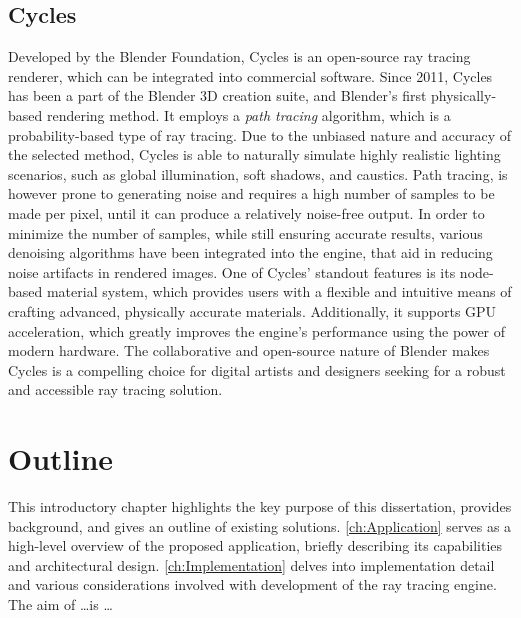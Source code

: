 \subsection{Cycles}

Developed by the Blender Foundation, Cycles \supercite{Cycles} is an open-source ray tracing renderer, which can be integrated into commercial software. 
Since 2011, Cycles has been a part of the Blender 3D creation suite, and Blender's first physically-based rendering method.
It employs a \textit{path tracing} algorithm, which is a probability-based type of ray tracing.
Due to the unbiased nature and accuracy of the selected method, Cycles is able to naturally simulate highly realistic lighting scenarios, such as global illumination, soft shadows, and caustics.
Path tracing, is however prone to generating noise and requires a high number of samples to be made per pixel, until it can produce a relatively noise-free output.
In order to minimize the number of samples, while still ensuring accurate results, various denoising algorithms have been integrated into the engine, that aid in reducing noise artifacts in rendered images.
One of Cycles' standout features is its node-based material system, which provides users with a flexible and intuitive means of crafting advanced, physically accurate materials. 
Additionally, it supports GPU acceleration, which greatly improves the engine's performance using the power of modern hardware.
The collaborative and open-source nature of Blender makes Cycles is a compelling choice for digital artists and designers seeking for a robust and accessible ray tracing solution.

\section{Outline}

This introductory chapter highlights the key purpose of this dissertation, provides background, and gives an outline of existing solutions. 
\cref{ch:Application} serves as a high-level overview of the proposed application, briefly describing its capabilities and architectural design. 
\cref{ch:Implementation} delves into implementation detail and various considerations involved with development of the ray tracing engine. 
The aim of \dots is \dots
